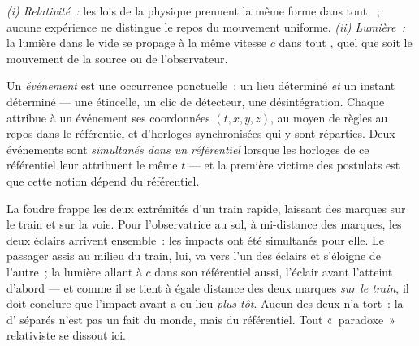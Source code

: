 \begin{theorem}\label{thm:b3:relativistic-kinematics:postulates}
\emph{(i) Relativité~:} les lois de la physique prennent la même forme
dans tout ~; aucune expérience ne distingue le
repos du mouvement uniforme. \emph{(ii) Lumière~:} la lumière dans le
vide se propage à la même vitesse $c$ dans tout ,
quel que soit le mouvement de la source ou de l'observateur.
\end{theorem}
\admitted

\begin{definition}\label{def:b3:relativistic-kinematics:event}
Un \emph{événement} est une occurrence ponctuelle~: un lieu déterminé
\emph{et} un instant déterminé --- une étincelle, un clic de détecteur,
une désintégration. Chaque  attribue à un événement
ses coordonnées $(t, x, y, z)$, au moyen de règles au repos dans le
référentiel et d'horloges synchronisées qui y sont réparties. Deux
événements sont \emph{simultanés dans un référentiel} lorsque les
horloges de ce référentiel leur attribuent le même $t$ --- et la
première victime des postulats est que cette notion dépend du
référentiel.
\end{definition}

\begin{example}\label{ex:b3:relativistic-kinematics:train}
La foudre frappe les deux extrémités d'un train rapide, laissant des
marques sur le train et sur la voie. Pour l'observatrice au sol, à
mi-distance des marques, les deux éclairs arrivent ensemble~: les
impacts ont été simultanés pour elle. Le passager assis au milieu du
train, lui, va vers l'un des éclairs et s'éloigne de l'autre~; la
lumière allant à $c$ dans son référentiel aussi, l'éclair avant
l'atteint d'abord --- et comme il se tient à égale distance des deux
marques \emph{sur le train}, il doit conclure que l'impact avant a eu
lieu \emph{plus tôt}. Aucun des deux n'a tort~: la 
d' séparés n'est pas un fait du monde, mais du référentiel.
Tout «~paradoxe~» relativiste se dissout ici.
\end{example}

